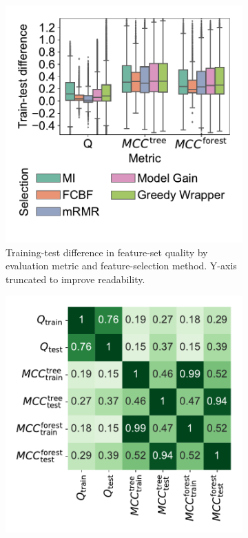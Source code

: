 \documentclass{article}
\theoremstyle{definition}
\begin{document}
\begin{figure}[htb]
	\centering
	\begin{subfigure}[t]{0.48\textwidth}
		\centering
		\includegraphics[width=\textwidth, trim=15 15 15 15, clip]{plots/afs-evaluation-metrics-overfitting.pdf}
		\caption{
			Training-test difference in feature-set quality by evaluation metric and feature-selection method.
			Y-axis truncated to improve readability.
		}
		\label{fig:afs:evaluation-metrics-overfitting}
	\end{subfigure}
	\hfill
	\begin{subfigure}[t]{0.48\textwidth}
		\centering
		\includegraphics[width=\textwidth, trim=15 15 15 15, clip]{plots/afs-evaluation-metrics-correlation.pdf}

\end{subfigure}
\end{figure}
\end{document}
